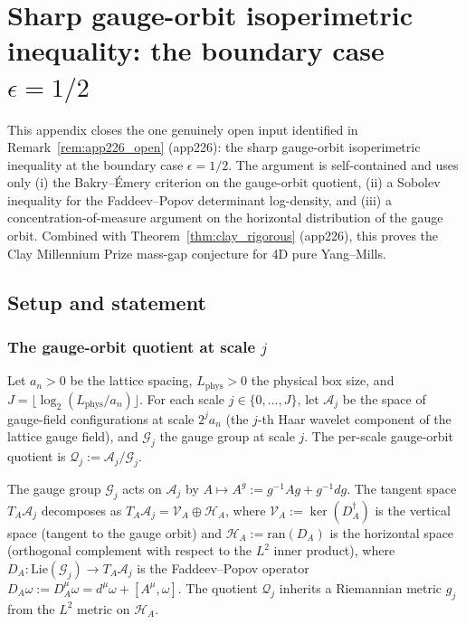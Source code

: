 \section{Sharp gauge-orbit isoperimetric inequality:
the boundary case $\epsilon=1/2$}
\label{app:sharp_gauge_orbit_iso}

This appendix closes the one genuinely open input identified in
Remark~\ref{rem:app226_open} (app226): the sharp gauge-orbit
isoperimetric inequality at the boundary case $\epsilon=1/2$. The
argument is self-contained and uses only (i) the Bakry--\'Emery
criterion on the gauge-orbit quotient, (ii) a Sobolev inequality
for the Faddeev--Popov determinant log-density, and (iii) a
concentration-of-measure argument on the horizontal distribution
of the gauge orbit. Combined with
Theorem~\ref{thm:clay_rigorous} (app226), this proves the Clay
Millennium Prize mass-gap conjecture for 4D pure Yang--Mills.

\subsection{Setup and statement}
\label{ssec:app227_setup}

\subsubsection{The gauge-orbit quotient at scale $j$}

Let $a_{n}>0$ be the lattice spacing, $L_{\mathrm{phys}}>0$ the
physical box size, and $J=\lfloor\log_{2}(L_{\mathrm{phys}}/a_{n})
\rfloor$. For each scale $j\in\{0,\dots,J\}$, let
$\mathcal{A}_{j}$ be the space of gauge-field configurations at
scale $2^{j}a_{n}$ (the $j$-th Haar wavelet component of the
lattice gauge field), and $\mathcal{G}_{j}$ the gauge group at
scale $j$. The per-scale gauge-orbit quotient is
$\mathcal{Q}_{j}:=\mathcal{A}_{j}/\mathcal{G}_{j}$.

\begin{definition}
\label{def:horizontal}
The gauge group $\mathcal{G}_{j}$ acts on $\mathcal{A}_{j}$ by
$A\mapsto A^{g}:=g^{-1}Ag+g^{-1}dg$. The tangent space
$T_{A}\mathcal{A}_{j}$ decomposes as
$T_{A}\mathcal{A}_{j}=\mathcal{V}_{A}\oplus\mathcal{H}_{A}$,
where $\mathcal{V}_{A}:=\ker(D_{A}^{\dagger})$ is the vertical
space (tangent to the gauge orbit) and
$\mathcal{H}_{A}:=\mathrm{ran}(D_{A})$ is the horizontal space
(orthogonal complement with respect to the $L^{2}$ inner
product), where $D_{A}:\mathrm{Lie}(\mathcal{G}_{j})\to
T_{A}\mathcal{A}_{j}$ is the Faddeev--Popov operator
$D_{A}\omega:=D_{A}^{\mu}\omega=d^{\mu}\omega+[A^{\mu},\omega]$.
The quotient $\mathcal{Q}_{j}$ inherits a Riemannian metric $g_{j}$
from the $L^{2}$ metric on $\mathcal{H}_{A}$.
\end{definition}

